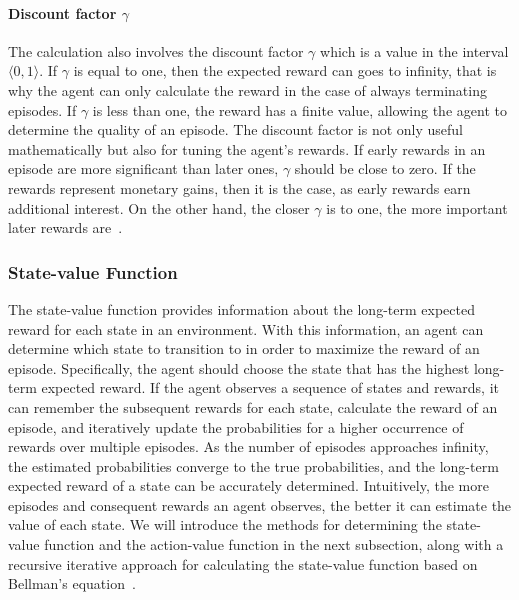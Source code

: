 \documentclass[../xlapes02]{subfiles}
\begin{document}
    \paragraph{Discount factor $\gamma$}\label{par:discount-factor}
    The calculation also involves the discount factor $\gamma$ which is a value in the interval $\langle 0, 1 \rangle$. If $\gamma$ is equal to one, then the expected reward can goes to infinity, that is why the agent can only calculate the reward in the case of always terminating episodes. If $\gamma$ is less than one, the reward has a finite value, allowing the agent to determine the quality of an episode. The discount factor is not only useful mathematically but also for tuning the agent's rewards. If early rewards in an episode are more significant than later ones, $\gamma$ should be close to zero. If the rewards represent monetary gains, then it is the case, as early rewards earn additional interest. On the other hand, the closer $\gamma$ is to one, the more important later rewards are~\cite{rao2022foundations, sutton2018reinforcement, perotto:hal-02363599}.

    \subsubsection{State-value Function}\label{subsubsec:state-value-function}
    The state-value function provides information about the long-term expected reward for each state in an environment. With this information, an agent can determine which state to transition to in order to maximize the reward of an episode. Specifically, the agent should choose the state that has the highest long-term expected reward. If the agent observes a sequence of states and rewards, it can remember the subsequent rewards for each state, calculate the reward of an episode, and iteratively update the probabilities for a higher occurrence of rewards over multiple episodes. As the number of episodes approaches infinity, the estimated probabilities converge to the true probabilities, and the long-term expected reward of a state can be accurately determined. Intuitively, the more episodes and consequent rewards an agent observes, the better it can estimate the value of each state. We will introduce the methods for determining the state-value function and the action-value function in the next subsection, along with a recursive iterative approach for calculating the state-value function based on Bellman's equation~\cite{FITMT25127}.
\end{document}
